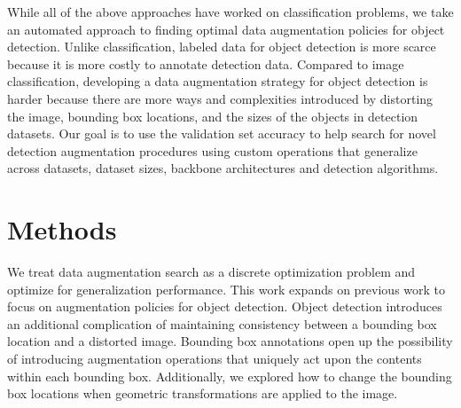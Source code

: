 \documentclass[10pt,twocolumn,letterpaper]{article}
\begin{document}
While all of the above approaches have worked on classification problems, we take an automated approach to finding optimal data augmentation policies for object detection. Unlike classification, labeled data for object detection is more scarce because it is more costly to annotate detection data. Compared to image classification, developing a data augmentation strategy for object detection is harder because there are more ways and complexities introduced by distorting the image, bounding box locations, and the sizes of the objects in detection datasets. Our goal is to use the validation set accuracy to help search for novel detection augmentation procedures using custom operations that generalize across datasets, dataset sizes, backbone architectures and detection algorithms. \section{Methods}

 We treat data augmentation search as a discrete optimization problem and optimize for generalization performance.
This work expands on previous work \cite{cubuk2018autoaugment} to focus on augmentation policies for object detection. Object detection introduces an additional complication of maintaining consistency between a bounding box location and a distorted image.
Bounding box annotations open up the possibility of introducing augmentation operations that uniquely act upon the contents within each bounding box. Additionally, we explored how to change the bounding box locations when geometric transformations are applied to the image.
\end{document}
